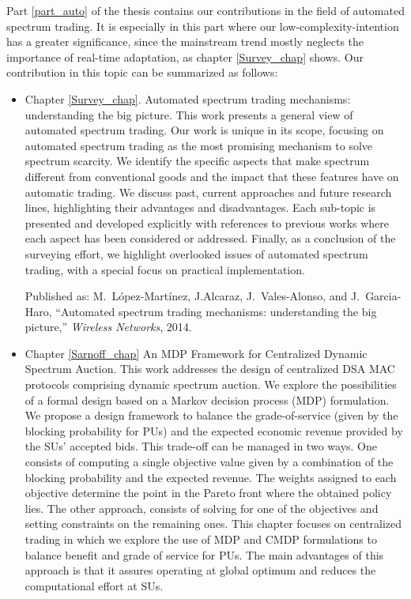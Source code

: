 Part \ref{part_auto} of the thesis contains our contributions in the field of automated spectrum trading. 
It is especially in this part where our low-complexity-intention has a greater significance, since the mainstream trend mostly neglects the importance of real-time adaptation, as chapter \ref{Survey_chap} shows. 
Our contribution in this topic can be summarized as follows:
\begin{itemize}
\item Chapter \ref{Survey_chap}. Automated spectrum trading mechanisms: understanding the big picture.
This work presents a general view of automated spectrum trading.
Our work is unique in its scope, focusing on automated spectrum trading as the most promising mechanism to solve spectrum scarcity.
We identify the specific aspects that make spectrum different from conventional goods and the impact that these features have on automatic trading.
We discuss past, current approaches and future research lines, highlighting their advantages and disadvantages. 
Each sub-topic is presented and developed explicitly with references to previous works where each aspect has been considered or addressed.
Finally, as a conclusion of the surveying effort, we highlight overlooked issues of automated spectrum trading, with a special focus on practical implementation.

Published as: M.~L\'{o}pez-Mart\'{i}nez, J.Alcaraz, J.~Vales-Alonso, and J.~Garcia-Haro,
  ``Automated spectrum trading mechanisms: understanding the big picture,''
  \emph{Wireless Networks}, 2014.
\item Chapter \ref{Sarnoff_chap} An MDP Framework for Centralized Dynamic Spectrum Auction.
This work addresses the design of centralized DSA MAC protocols comprising dynamic spectrum auction. We explore the possibilities of a formal design based on a Markov decision process (MDP) formulation. We propose a design framework to balance the grade-of-service (given by the blocking probability for PUs) and the expected economic revenue provided by the SUs' accepted bids. 
This trade-off can be managed in two ways. One consists of computing a single objective value given by a combination of the blocking probability and the expected revenue. 
The weights assigned to each objective determine the point in the Pareto front where the obtained policy lies. The other approach, consists of solving for one of the objectives and setting constraints on the remaining ones.
This chapter focuses on centralized trading in which we explore the use of MDP and CMDP formulations to balance benefit and grade of service for PUs. 
The main advantages of this approach is that it assures operating at global optimum and reduces the computational effort at SUs.


\end{itemize}
